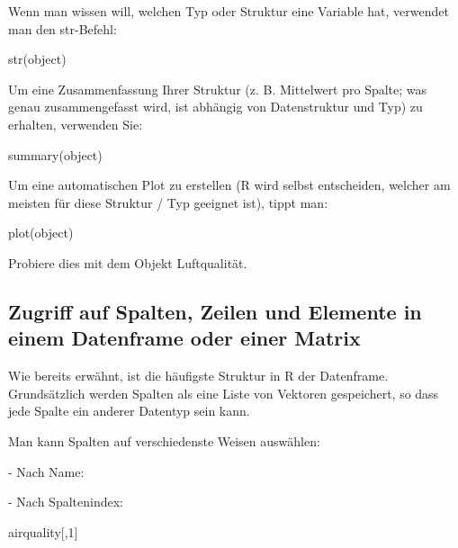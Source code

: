 \documentclass[a4paper,twoside]{tufte-book}\usepackage[]{graphicx}\usepackage[]{color}
\begin{document}
\begin{appendices}
Wenn man wissen will, welchen Typ oder Struktur eine Variable hat, verwendet man den str-Befehl:

\begin{Schunk}
\begin{Sinput}
str(object)
\end{Sinput}
\end{Schunk}

Um eine Zusammenfassung Ihrer Struktur (z. B. Mittelwert pro Spalte; was genau zusammengefasst wird, ist abhängig von Datenstruktur und Typ) zu erhalten, verwenden Sie:

\begin{Schunk}
\begin{Sinput}
summary(object)
\end{Sinput}
\end{Schunk}

Um eine automatischen Plot zu erstellen (R wird selbst entscheiden, welcher am meisten für diese Struktur / Typ geeignet ist), tippt man:

\begin{Schunk}
\begin{Sinput}
plot(object)
\end{Sinput}
\end{Schunk}

Probiere dies mit dem Objekt Luftqualität.

\subsection{Zugriff auf Spalten, Zeilen und Elemente in einem Datenframe oder einer Matrix}

Wie bereits erwähnt, ist die häufigste Struktur in R der Datenframe. Grundsätzlich werden Spalten als eine Liste von Vektoren gespeichert, so dass jede Spalte ein anderer Datentyp sein kann.

Man kann Spalten auf verschiedenste Weisen auswählen:

- Nach Name:
\begin{Schunk}
\end{Schunk}

- Nach Spaltenindex: 

\begin{Schunk}
\begin{Sinput}
airquality[,1]
\end{Sinput}
\end{Schunk}


\end{appendices}
\end{document}

